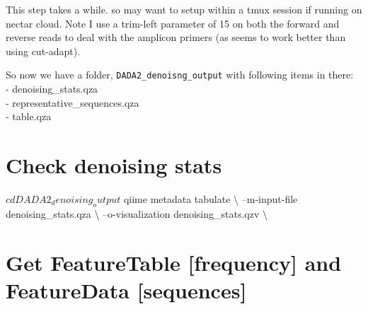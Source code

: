 \documentclass[
]{book}
\newenvironment{Shaded}{\begin{snugshade}}{\end{snugshade}}
\newcommand{\BuiltInTok}[1]{#1}
\newcommand{\ExtensionTok}[1]{#1}
\newcommand{\NormalTok}[1]{#1}
\newcommand{\OperatorTok}[1]{\textcolor[rgb]{0.81,0.36,0.00}{\textbf{#1}}}
\begin{document}
This step takes a while. so may want to setup within a tmux session if running on nectar cloud. Note I use a trim-left parameter of 15 on both the forward and reverse reads to deal with the amplicon primers (as seems to work better than using cut-adapt).

\begin{Shaded}
\end{Shaded}

So now we have a folder, \texttt{DADA2\_denoisng\_output} with following items in there:\\
- denoising\_stats.qza\\
- representative\_sequences.qza\\
- table.qza

\hypertarget{check-denoising-stats}{%
\section{Check denoising stats}\label{check-denoising-stats}}

\begin{Shaded}
\begin{Highlighting}[]
\NormalTok{$ }\BuiltInTok{cd}\NormalTok{ DADA2_denoising_output}

\NormalTok{$ }\ExtensionTok{qiime}\NormalTok{ metadata tabulate \textbackslash{}}
\NormalTok{--m-input-file denoising_stats.qza \textbackslash{}}
\NormalTok{--o-visualization denoising_stats.qzv \textbackslash{}}
\end{Highlighting}
\end{Shaded}

\hypertarget{get-featuretable-frequency-and-featuredata-sequences}{%
\section{Get FeatureTable {[}frequency{]} and FeatureData {[}sequences{]}}\label{get-featuretable-frequency-and-featuredata-sequences}}
\end{document}

